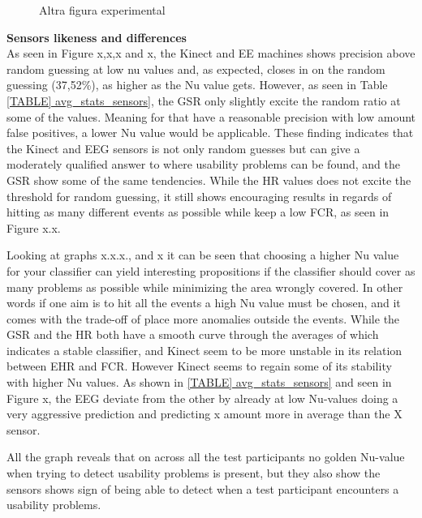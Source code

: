 \begin{figure}[h!]
\begin{minipage}[t]{0.5\textwidth}
    \caption{Altra figura experimental}
    \label{fase2}
  \end{minipage}
\end{figure}

\textbf{Sensors likeness and differences}\\
As seen in Figure x,x,x and x, the Kinect and EE machines shows precision above random guessing at low nu values and, as expected, closes in on the random guessing (37,52\%), as higher as the Nu value gets. However, as seen in Table \ref{TABLE] avg_stats_sensors}, the GSR only slightly excite the random ratio at some of the values. Meaning for  that have a reasonable precision with low amount false positives, a lower Nu value would be applicable.
These finding indicates that the Kinect and EEG sensors is not only random guesses but can give a moderately qualified answer to where usability problems can be found, and the GSR show some of the same tendencies.
While the HR values does not excite the threshold for random guessing, it still shows encouraging results in regards of hitting as many different events as possible while keep a low FCR, as seen in Figure x.x.

Looking at graphs x.x.x., and x it can be seen that choosing a higher Nu value for your classifier can yield interesting propositions if the classifier should cover as many problems as possible while minimizing the area wrongly covered.
In other words if one aim is to hit all the events a high Nu value must be chosen, and it comes with the trade-off of place more anomalies outside the events. 
While the GSR and the HR both have a smooth curve through the averages of which indicates a stable classifier, and Kinect seem to be more unstable in its relation between EHR and FCR. However Kinect seems to regain some of its stability with higher Nu values. As shown in \ref{TABLE] avg_stats_sensors} and seen in Figure x, the EEG deviate from the other by already at low Nu-values doing a very aggressive prediction and predicting x amount more in average than the X sensor.

All the graph reveals that on across all the test participants no golden Nu-value when trying to detect usability problems is present, but they also show the sensors shows sign of being able to detect when a test participant encounters a usability problems.